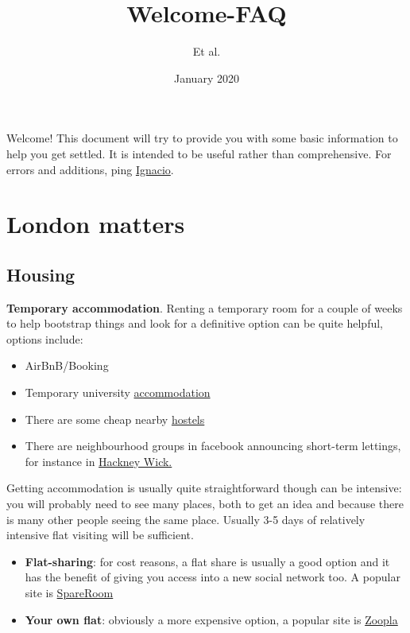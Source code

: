 \documentclass{article}
\title{Welcome-FAQ}
\author{Et al.}
\date{January 2020}
\begin{document}
\maketitle

Welcome!
This document will try to provide you with some basic information to help you get settled. It is intended to be useful rather than comprehensive. For errors and additions, ping \href{mailto:i.castro@qmul.ac.uk}{Ignacio}.



\section{London matters}
\subsection{Housing}
\textbf{Temporary accommodation}. Renting a temporary room for a couple of weeks to help bootstrap things and look for a definitive option can be quite helpful,  options include:
\begin{itemize}
    \item AirBnB/Booking
    \item Temporary university \href{https://www.universityrooms.com/en-GB/search/in/london}{accommodation}
    \item There are some cheap nearby \href{https://lhalondon.com/properties/davies-court/}{hostels}
    \item There are neighbourhood groups in facebook announcing short-term lettings, for instance in  \href{https://www.facebook.com/groups/HWSpaces/}{Hackney Wick.}
\end{itemize}

Getting accommodation is usually quite straightforward though can be intensive: you will probably need to see many places, both to get an idea and because there is many other people seeing the same place. Usually 3-5 days of relatively intensive flat visiting will be sufficient.
\begin{itemize}
    \item \textbf{Flat-sharing}: for cost reasons, a flat share is usually a good option and it has the benefit of giving you access into a new social network too. A popular site is \href{https://www.spareroom.co.uk/}{SpareRoom} 
    \item \textbf{Your own flat}: obviously a more expensive option, a popular site is \href{https://www.zoopla.co.uk//}{Zoopla}
\end{itemize}
    
\end{document}
